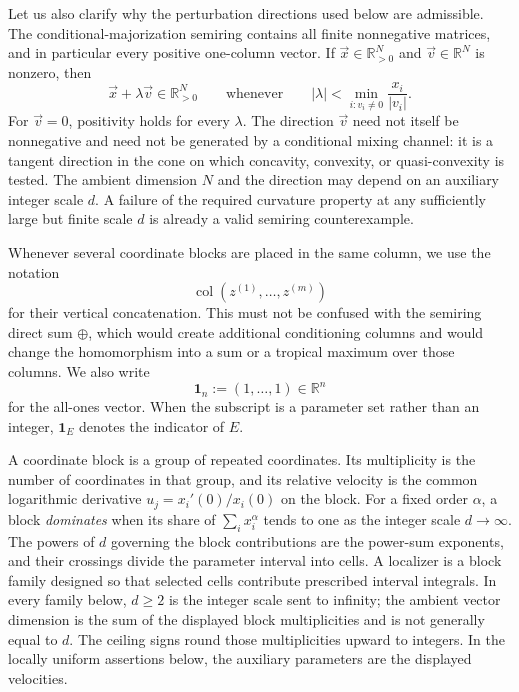 \documentclass[aps,pra,11pt,onecolumn,nofootinbib,tightenlines]{revtex4-2}
\theoremstyle{definition}
\begin{document}
Let us also clarify why the perturbation directions used below are admissible. The conditional-majorization semiring contains all finite nonnegative matrices, and in particular every positive one-column vector. If $\vec x\in\mathbb R^N_{>0}$ and $\vec v\in\mathbb R^N$ is nonzero, then
\begin{equation}
 \vec x+\lambda\vec v\in\mathbb R^N_{>0}
 \qquad\text{whenever}\qquad
 |\lambda|<\min_{i:v_i\neq0}\frac{x_i}{|v_i|}.
 \label{eq:positive-line-admissibility}
\end{equation}
For $\vec v=0$, positivity holds for every $\lambda$.  The direction $\vec v$
need not itself be nonnegative and need not be generated by a conditional
mixing channel: it is a tangent direction in the cone on which concavity,
convexity, or quasi-convexity is tested. The ambient dimension $N$ and the
direction may depend on an auxiliary integer scale $d$. A failure of the
required curvature property at any sufficiently large but finite scale $d$
is already a valid semiring counterexample.

Whenever several coordinate blocks are placed in the same column, we use the notation
\begin{equation}
 \operatorname{col}(z^{(1)},\ldots,z^{(m)})
 \label{eq:col-notation}
\end{equation}
for their vertical concatenation. This must not be confused with the semiring direct sum $\oplus$, which would create additional conditioning columns and would change the homomorphism into a sum or a tropical maximum over those columns.
We also write
\begin{equation}
\mathbf1_n:=(1,\ldots,1)\in\mathbb R^n
\label{eq:ones-vector-definition}
\end{equation}
for the all-ones vector.  When the subscript is a parameter set rather than an
integer, $\mathbf1_E$ denotes the indicator of $E$.

A coordinate block is a group of repeated coordinates.  Its multiplicity is
the number of coordinates in that group, and its relative velocity is the
common logarithmic derivative $u_j=x_i'(0)/x_i(0)$ on the block.  For a fixed
order $\alpha$, a block \emph{dominates} when its share of
$\sum_i x_i^\alpha$ tends to one as the integer scale $d\to\infty$.  The powers
of $d$ governing the block contributions are the power-sum exponents, and their
crossings divide the parameter interval into cells.  A localizer is a block
family designed so that selected cells contribute prescribed interval
integrals.  In every family below, $d\geq2$ is the integer scale sent to
infinity; the ambient vector dimension is the sum of the displayed block
multiplicities and is not generally equal to $d$.  The ceiling signs round
those multiplicities upward to integers.  In the locally uniform assertions
below, the auxiliary parameters are the displayed velocities.
\end{document}
